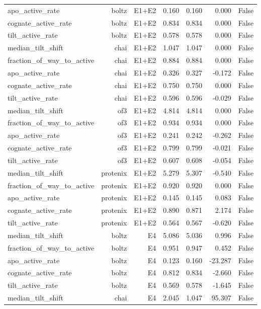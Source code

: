 \begin{longtable}{lrrrrrr}
apo\_active\_rate & boltz & E1+E2 & 0.160 & 0.160 & 0.000 & False \\
cognate\_active\_rate & boltz & E1+E2 & 0.834 & 0.834 & 0.000 & False \\
tilt\_active\_rate & boltz & E1+E2 & 0.578 & 0.578 & 0.000 & False \\
median\_tilt\_shift & chai & E1+E2 & 1.047 & 1.047 & 0.000 & False \\
fraction\_of\_way\_to\_active & chai & E1+E2 & 0.884 & 0.884 & 0.000 & False \\
apo\_active\_rate & chai & E1+E2 & 0.326 & 0.327 & -0.172 & False \\
cognate\_active\_rate & chai & E1+E2 & 0.750 & 0.750 & 0.000 & False \\
tilt\_active\_rate & chai & E1+E2 & 0.596 & 0.596 & -0.029 & False \\
median\_tilt\_shift & of3 & E1+E2 & 4.814 & 4.814 & 0.000 & False \\
fraction\_of\_way\_to\_active & of3 & E1+E2 & 0.934 & 0.934 & 0.000 & False \\
apo\_active\_rate & of3 & E1+E2 & 0.241 & 0.242 & -0.262 & False \\
cognate\_active\_rate & of3 & E1+E2 & 0.799 & 0.799 & -0.021 & False \\
tilt\_active\_rate & of3 & E1+E2 & 0.607 & 0.608 & -0.054 & False \\
median\_tilt\_shift & protenix & E1+E2 & 5.279 & 5.307 & -0.540 & False \\
fraction\_of\_way\_to\_active & protenix & E1+E2 & 0.920 & 0.920 & 0.000 & False \\
apo\_active\_rate & protenix & E1+E2 & 0.145 & 0.145 & 0.083 & False \\
cognate\_active\_rate & protenix & E1+E2 & 0.890 & 0.871 & 2.174 & False \\
tilt\_active\_rate & protenix & E1+E2 & 0.564 & 0.567 & -0.620 & False \\
median\_tilt\_shift & boltz & E4 & 5.086 & 5.036 & 0.996 & False \\
fraction\_of\_way\_to\_active & boltz & E4 & 0.951 & 0.947 & 0.452 & False \\
apo\_active\_rate & boltz & E4 & 0.123 & 0.160 & -23.287 & False \\
cognate\_active\_rate & boltz & E4 & 0.812 & 0.834 & -2.660 & False \\
tilt\_active\_rate & boltz & E4 & 0.569 & 0.578 & -1.645 & False \\
median\_tilt\_shift & chai & E4 & 2.045 & 1.047 & 95.307 & False \\

\end{longtable}
